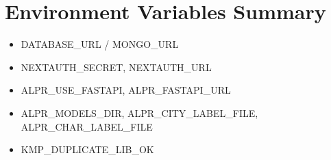 \documentclass[12pt]{article}
\begin{document}
\section{Environment Variables Summary}
\begin{itemize}[leftmargin=*]
\item DATABASE\_URL / MONGO\_URL
\item NEXTAUTH\_SECRET, NEXTAUTH\_URL
\item ALPR\_USE\_FASTAPI, ALPR\_FASTAPI\_URL
\item ALPR\_MODELS\_DIR, ALPR\_CITY\_LABEL\_FILE, ALPR\_CHAR\_LABEL\_FILE
\item KMP\_DUPLICATE\_LIB\_OK
\end{itemize}
\end{document}
